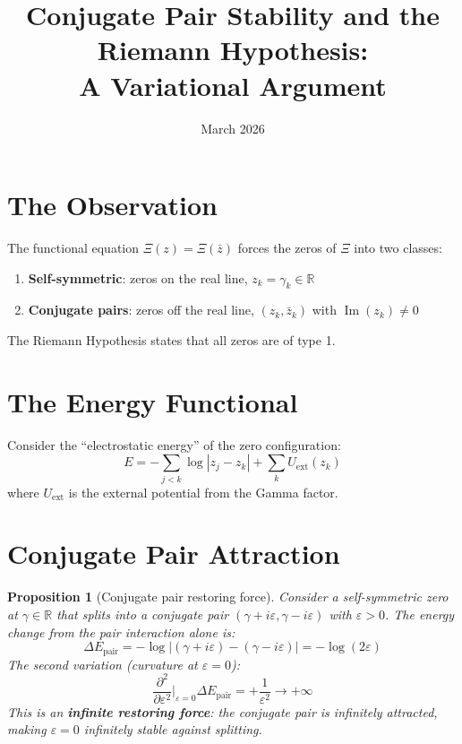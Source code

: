\documentclass[11pt]{article}
\title{Conjugate Pair Stability and the Riemann Hypothesis:\\A Variational Argument}
\date{March 2026}
\newtheorem{proposition}{Proposition}
\begin{document}
\maketitle

\section{The Observation}

The functional equation $\Xi(z) = \Xi(\bar{z})$ forces the zeros of $\Xi$ into two classes:
\begin{enumerate}
\item \textbf{Self-symmetric}: zeros on the real line, $z_k = \gamma_k \in \mathbb{R}$
\item \textbf{Conjugate pairs}: zeros off the real line, $(z_k, \bar{z}_k)$ with $\operatorname{Im}(z_k) \neq 0$
\end{enumerate}

The Riemann Hypothesis states that all zeros are of type 1.

\section{The Energy Functional}

Consider the ``electrostatic energy'' of the zero configuration:
\[
E = -\sum_{j < k} \log |z_j - z_k| + \sum_k U_{\mathrm{ext}}(z_k)
\]
where $U_{\mathrm{ext}}$ is the external potential from the Gamma factor.

\section{Conjugate Pair Attraction}

\begin{proposition}[Conjugate pair restoring force]
Consider a self-symmetric zero at $\gamma \in \mathbb{R}$ that splits into a conjugate pair $(\gamma + i\varepsilon, \gamma - i\varepsilon)$ with $\varepsilon > 0$. The energy change from the pair interaction alone is:
\[
\Delta E_{\mathrm{pair}} = -\log|(\gamma + i\varepsilon) - (\gamma - i\varepsilon)| = -\log(2\varepsilon)
\]
The second variation (curvature at $\varepsilon = 0$):
\[
\frac{\partial^2}{\partial \varepsilon^2}\bigg|_{\varepsilon = 0} \Delta E_{\mathrm{pair}} = +\frac{1}{\varepsilon^2} \to +\infty
\]
This is an \textbf{infinite restoring force}: the conjugate pair is infinitely attracted, making $\varepsilon = 0$ infinitely stable against splitting.
\end{proposition}
\end{document}

